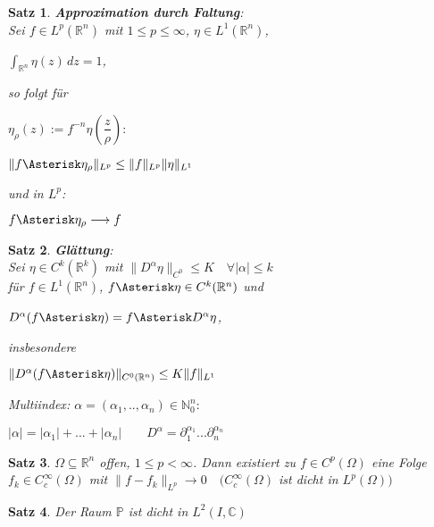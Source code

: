 \documentclass[11pt]{memoir}
\theoremstyle{changebreak}
\newtheorem{Satz}{Satz}[chapter]
\begin{document}
\begin{Satz}
\emph{\textbf{Approximation durch Faltung}}: \\
Sei $f \in L^p(\mathbb R^n)$ mit $1 \leq p \leq \infty$, $\eta \in L^1(\mathbb R^n)$, 
\begin{center}
	$\int_{\mathbb R^n} \eta(z) \,dz = 1$, 
\end{center}
so folgt für 
\begin{center}
	$\eta_\rho (z):= f^{-n} \eta\left(\dfrac{z}{\rho}\right):$
\end{center}
\begin{center}
	$\|f \Asterisk \eta_\rho\|_{L^p} \leq \|f\|_{L^p} \|\eta\|_{L^1}$
\end{center}
und in $L^p$:
\begin{center}
	$f \Asterisk \eta_\rho \longrightarrow f$
\end{center}
\end{Satz}


\begin{Satz}
\emph{\textbf{Glättung}}: \\
Sei $\eta \in C^k(\mathbb R^k)$ mit $\|D^\alpha \eta\|_{C^0} \leq K \quad \forall |\alpha| \leq k$ \\
für $f \in L^1(\mathbb R^n)$, 
$f \Asterisk \eta \in C^k(\mathbb R^n)$ und 
\begin{center}
	$D^\alpha(f \Asterisk \eta) = f \Asterisk D^\alpha \eta$, 
\end{center}
insbesondere
\begin{center}
	$\|D^\alpha (f \Asterisk \eta) \|_{C^0(\mathbb R^n)} \leq K \|f\|_{L^1}$
\end{center}
\emph{Multiindex}: 
$\alpha = (\alpha_1, .., \alpha_n) \in \mathbb N_0^n:$
\begin{center}
	$|\alpha| = |\alpha_1| + ... + |\alpha_n| \qquad D^\alpha = \partial_1^{\alpha_1}... \partial_n^{\alpha_n}$
\end{center}
\end{Satz}


\begin{Satz}
$\Omega \subseteq \mathbb R^n$ offen, $1 \leq p < \infty$. Dann existiert zu $f \in C^p(\Omega)$ eine Folge $f_k \in C_c^\infty(\Omega)$ mit $\|f-f_k\|_{L^p} \rightarrow 0 \quad (C_c^\infty(\Omega)$ ist dicht in $L^p(\Omega))$ 
\end{Satz}

\begin{Satz}
Der Raum $\mathbb P$ ist dicht in $L^2(I, \mathbb C)$
\end{Satz}
\end{document}

